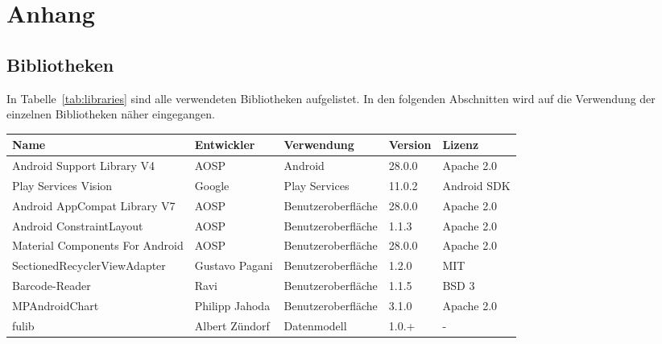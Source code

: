 \section{Anhang}\label{sec:bib}

\subsection{Bibliotheken}\label{subsec:bibliotheken}

In Tabelle~\ref{tab:libraries} sind alle verwendeten Bibliotheken aufgelistet.
In den folgenden Abschnitten wird auf die Verwendung der einzelnen Bibliotheken näher eingegangen.

\begin{table}[h]
	\renewcommand{\arraystretch}{1.1}

	\begin{tabularx}{\textwidth}{|X|l|l|l|l|}
		\hline
		\textbf{Name} & \textbf{Entwickler} & \textbf{Verwendung} & \textbf{Version} & \textbf{Lizenz} \\
		[0.5ex] \hline
		Android Support Library V4 & AOSP & Android & 28.0.0 & Apache 2.0\\   %
		\hline

		Play Services Vision & Google & Play Services & 11.0.2 & Android SDK\\  %
		\hline

		Android AppCompat Library V7 & AOSP & Benutzeroberfläche & 28.0.0 & Apache 2.0\\    %
		Android ConstraintLayout & AOSP & Benutzeroberfläche & 1.1.3 & Apache 2.0\\   %
		Material Components For Android & AOSP & Benutzeroberfläche & 28.0.0 & Apache 2.0\\  %
		SectionedRecyclerViewAdapter & Gustavo Pagani & Benutzeroberfläche & 1.2.0 & MIT\\   %
		Barcode-Reader & Ravi & Benutzeroberfläche & 1.1.5 & BSD 3\\   %
		MPAndroidChart & Philipp Jahoda & Benutzeroberfläche & 3.1.0 & Apache 2.0\\  %
		\hline

		fulib & Albert Zündorf & Datenmodell & 1.0.+ & -\\    %
		\hline


\end{tabularx}
\end{table}
